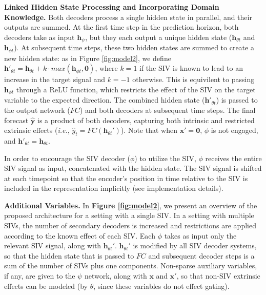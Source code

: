 \documentclass[letterpaper]{article}
\begin{document}
 \textbf{Linked Hidden State Processing and Incorporating Domain Knowledge.} Both decoders process a single hidden state in parallel, and their outputs are summed. At the first time step in the prediction horizon, both decoders take as input $\mathbf{h}_{\psi}$, but they each output a unique hidden state ($\mathbf{h}_{{\theta}t}$ and $\mathbf{h}_{{\phi}t}$).  At subsequent time steps, these two hidden states are summed to create a new hidden state: as in Figure \ref{fig:model2}, we define $\mathbf{h}'_{{\theta}t} = \mathbf{h}_{{\theta}t} + k\cdot max(\mathbf{h}_{{\phi}t},\mathbf{0})$, where $k=1$ if the SIV is known to lead to an increase in the target signal and $k=-1$ otherwise. This is equivilent to passing $\mathbf{h}_{{\phi}t}$ through a ReLU function, which restricts the effect of the SIV on the target variable to the expected direction. The combined hidden state ($\mathbf{h}'_{{\theta}t}$) is passed to the output network ($FC$) and both decoders at subsequent time steps.  The final forecast $\hat{\mathbf{y}}$ is a product of both decoders, capturing both intrinsic and restricted extrinsic effects (\textit{i.e.}, $\hat{y}_t=FC(\mathbf{h}_{{\theta}t}')$). Note that when $\mathbf{x}'=\mathbf{0}$, $\phi$ is not engaged, and $\mathbf{h}'_{{\theta}t}=\mathbf{h}_{{\theta}t}$.

In order to encourage the SIV decoder ($\phi$) to utilize the SIV, $\phi$ receives the entire SIV signal as input, concatenated with the hidden state. The SIV signal is shifted at each timepoint so that the encoder's position in time relative to the SIV is included in the representation implicitly (see implementation details).








\textbf{Additional Variables.} In \textbf{Figure \ref{fig:model2}}, we present an overview of the proposed architecture for a setting with a single SIV. In a setting with multiple SIVs, the number of secondary decoders is increased and restrictions are applied according to the known effect of each SIV. Each $\phi$ takes as input only the relevant SIV signal, along with $\mathbf{h}_{{\theta}t}'$.  $\mathbf{h}_{{\theta}t}'$ is modified by all SIV decoder systems, so that the hidden state that is passed to $FC$ and subsequent decoder steps is a sum of the number of SIVs plus one components. Non-sparse auxiliary variables, if any, are given to the $\psi$ network, along with $\mathbf{x}$ and $\mathbf{x}'$, so that non-SIV extrinsic effects can be modeled (by $\theta$, since these variables do not effect gating).
\end{document}
